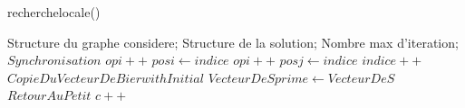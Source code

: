 \documentclass[11pt]{ctexart}
\begin{document}
\renewcommand{\thealgorithm}{} %
    \begin{algorithm}
        \caption{recherchelocale()} %
        \begin{algorithmic}[1] %
            \Require Structure du graphe considere;
                    Structure de la solution;
                    Nombre max d'iteration;
                    \State $Synchronisation$
                \Else
                            \State $opi++$
                                \State $posi \leftarrow indice$
                            \EndIf
                        \EndIf
                        \Else{} 
                            \State $opi++$
                                \State $posj \leftarrow indice$
                            \EndIf
                        \EndIf
                        \State $indice ++$
                    \EndWhile
                    \State $CopieDuVecteurDeBierwithInitial$
                    \State $VecteurDeSprime \leftarrow VecteurDeS$
                        \State $RetourAuPetit$
                    \EndIf
                \EndIf
                \State $c++$
            \EndIf
        \end{algorithmic}
    \end{algorithm}
\end{document}
